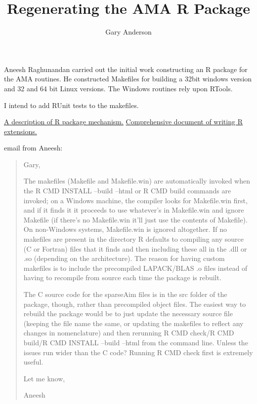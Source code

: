 \documentclass[12pt]{article}
\title{Regenerating the AMA R Package}
\author{Gary Anderson}
\begin{document}
\maketitle

Aneesh Raghunandan carried out the initial work constructing an R package for
the  AMA routines.  He constructed Makefiles for building a 32bit windows version and 32 and 64 bit Linux versions.  The Windows routines rely upon RTools.

I intend to add RUnit tests to the makefiles.


\href{http://biosun1.harvard.edu/courses/individual/bio271/lectures/L6/Rpkg.pdf}{A description of R package mechanism.}
\href{http://cran.r-project.org/doc/manuals/R-exts.pdf}{Comprehensive document of writing R extensions.}


\appendix

email from Aneesh:

\begin{quote}
  Gary,


The makefiles (Makefile and Makefile.win) are automatically invoked when the R CMD INSTALL --build --html or R CMD build commands are invoked; on a Windows machine, the compiler looks for Makefile.win first, and if it finds it it proceeds to use whatever's in Makefile.win and ignore Makefile (if there's no Makefile.win it'll just use the contents of Makefile). On non-Windows systems, Makefile.win is ignored altogether.  If no makefiles are present in the directory R defaults to compiling any source (C or Fortran) files that it finds and then including these all in the .dll or .so (depending on the architecture).  The reason for having custom makefiles is to include the precompiled LAPACK/BLAS .o files instead of having to recompile from source each time the package is rebuilt. 


The C source code for the sparseAim files is in the src folder of the package, though, rather than precompiled object files. The easiest way to rebuild the package would be to just update the necessary source file (keeping the file name the same, or updating the makefiles to reflect any changes in nomenclature) and then rerunning R CMD check/R CMD build/R CMD INSTALL --build --html from the command line.  Unless the issues run wider than the C code? Running R CMD check first is extremely useful.


Let me know,


Aneesh
\end{quote}
\end{document}
